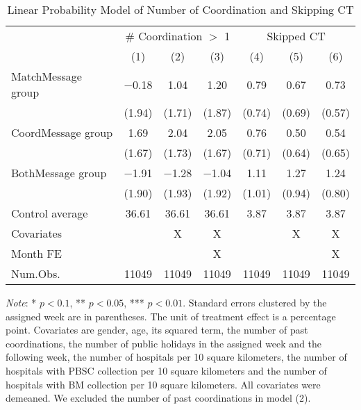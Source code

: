 \documentclass[12pt, a4paper]{article}
\begin{document}
\begin{table}[H]

\caption{\label{tab:lm-skip}Linear Probability Model of Number of Coordination and Skipping CT}
\centering
\fontsize{8}{10}\selectfont
\begin{threeparttable}
\begin{tabular}[t]{lcccccc}
\toprule
\multicolumn{1}{c}{ } & \multicolumn{3}{c}{\# Coordination $>$ 1} & \multicolumn{3}{c}{Skipped CT} \\
\cmidrule(l{3pt}r{3pt}){2-4} \cmidrule(l{3pt}r{3pt}){5-7}
  & (1) & (2) & (3) & (4) & (5) & (6)\\
\midrule
MatchMessage group & \num{-0.18} & \num{1.04} & \num{1.20} & \num{0.79} & \num{0.67} & \num{0.73}\\
 & (\num{1.94}) & (\num{1.71}) & (\num{1.87}) & (\num{0.74}) & (\num{0.69}) & (\num{0.57})\\
CoordMessage group & \num{1.69} & \num{2.04} & \num{2.05} & \num{0.76} & \num{0.50} & \num{0.54}\\
 & (\num{1.67}) & (\num{1.73}) & (\num{1.67}) & (\num{0.71}) & (\num{0.64}) & (\num{0.65})\\
BothMessage group & \num{-1.91} & \num{-1.28} & \num{-1.04} & \num{1.11} & \num{1.27} & \num{1.24}\\
 & (\num{1.90}) & (\num{1.93}) & (\num{1.92}) & (\num{1.01}) & (\num{0.94}) & (\num{0.80})\\
\midrule
Control average & 36.61 & 36.61 & 36.61 & 3.87 & 3.87 & 3.87\\
Covariates &  & X & X &  & X & X\\
Month FE &  &  & X &  &  & X\\
Num.Obs. & \num{11049} & \num{11049} & \num{11049} & \num{11049} & \num{11049} & \num{11049}\\
\bottomrule
\end{tabular}
\begin{tablenotes}
\item \emph{Note}: * $p < 0.1$, ** $p < 0.05$, *** $p < 0.01$. Standard errors clustered by the assigned week are in parentheses. The unit of treatment effect is a percentage point. Covariates are gender, age, its squared term, the number of past coordinations, the number of public holidays in the assigned week and the following week, the number of hospitals per 10 square kilometers, the number of hospitals with PBSC collection per 10 square kilometers and the number of hospitals with BM collection per 10 square kilometers. All covariates were demeaned. We excluded the number of past coordinations in model (2).
\end{tablenotes}
\end{threeparttable}
\end{table}
\end{document}
